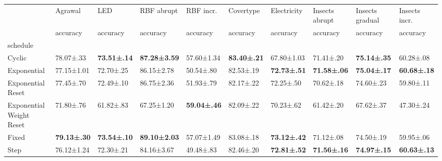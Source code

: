 \begin{tabular}{llllllllll}
\toprule
 & Agrawal & LED & RBF abrupt & RBF incr. & Covertype & Electricity & Insects abrupt & Insects gradual & Insects incr. \\
 & accuracy & accuracy & accuracy & accuracy & accuracy & accuracy & accuracy & accuracy & accuracy \\
schedule &  &  &  &  &  &  &  &  &  \\
\midrule
Cyclic & 78.07±.33 & \bfseries 73.51±.14 & \bfseries 87.28±3.59 & 57.60±1.34 & \bfseries 83.40±.21 & 67.80±1.03 & 71.41±.20 & \bfseries 75.14±.35 & 60.28±.08 \\
Exponential & 77.15±1.01 & 72.70±.25 & 86.15±2.78 & 50.54±.80 & 82.53±.19 & \bfseries 72.73±.51 & \bfseries 71.58±.06 & \bfseries 75.04±.17 & \bfseries 60.68±.18 \\
Exponential Reset & 77.45±.70 & 72.49±.10 & 86.75±2.36 & 51.93±.79 & 82.17±.22 & 72.25±.50 & 70.62±.18 & 74.60±.23 & 59.80±.11 \\
Exponential Weight Reset & 71.80±.76 & 61.82±.83 & 67.25±1.20 & \bfseries 59.04±.46 & 82.09±.22 & 70.23±.62 & 61.42±.20 & 67.62±.37 & 47.30±.24 \\
Fixed & \bfseries 79.13±.30 & \bfseries 73.54±.10 & \bfseries 89.10±2.03 & 57.07±1.49 & 83.08±.18 & \bfseries 73.12±.42 & 71.12±.08 & 74.50±.19 & 59.95±.06 \\
Step & 76.12±1.24 & 72.30±.21 & 84.16±3.67 & 49.48±.83 & 82.46±.20 & \bfseries 72.81±.52 & \bfseries 71.56±.16 & \bfseries 74.97±.15 & \bfseries 60.63±.13 \\
\bottomrule
\end{tabular}
